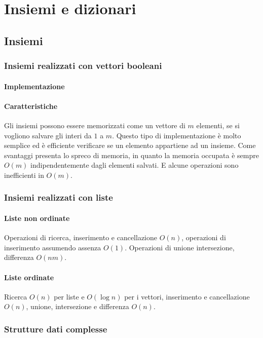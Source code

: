 \chapter{Insiemi e dizionari}
\section{Insiemi}
\subsection{Insiemi realizzati con vettori booleani}
\subsubsection{Implementazione}

\subsubsection{Caratteristiche}
Gli insiemi possono essere memorizzati come un vettore di $m$ elementi, se si vogliono salvare gli interi da $1$ a $m$. Questo tipo di implementazione \`e
molto semplice ed \`e efficiente verificare se un elemento appartiene ad un insieme. Come svantaggi presenta lo spreco di memoria, in quanto la memoria
occupata \`e sempre $O(m)$ indipendentemente dagli elementi salvati. E alcune operazioni sono inefficienti in $O(m)$. 
\subsection{Insiemi realizzati con liste}
\subsubsection{Liste non ordinate}
Operazioni di ricerca, inserimento e cancellazione $O(n)$, operazioni di inserimento assumendo assenza $O(1)$. Operazioni di unione intersezione, differenza
$O(nm)$.

\subsubsection{Liste ordinate}
Ricerca $O(n)$ per liste e $O(\log n)$ per i vettori, inserimento e cancellazione $O(n)$, unione, intersezione e differenza $O(n)$.\\

\subsection{Strutture dati complesse}
